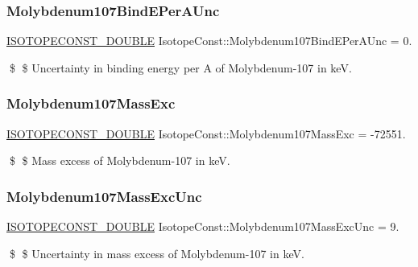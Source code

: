 \subsubsection{\texorpdfstring{Molybdenum107\+Bind\+E\+Per\+A\+Unc}{Molybdenum107BindEPerAUnc}}
{\footnotesize\ttfamily \mbox{\hyperlink{group___isotope_const-_macros_ga8f45a7272ce02c0b4c65c44636ed719a}{I\+S\+O\+T\+O\+P\+E\+C\+O\+N\+S\+T\+\_\+\+D\+O\+U\+B\+LE}} Isotope\+Const\+::\+Molybdenum107\+Bind\+E\+Per\+A\+Unc = 0.}

\$ \$ Uncertainty in binding energy per A of Molybdenum-\/107 in keV. \mbox{\label{group___isotope_const-_molybdenum-_mo107_ga0563f92515ff66e4d522d8627c73a3a8}} 
\subsubsection{\texorpdfstring{Molybdenum107\+Mass\+Exc}{Molybdenum107MassExc}}
{\footnotesize\ttfamily \mbox{\hyperlink{group___isotope_const-_macros_ga8f45a7272ce02c0b4c65c44636ed719a}{I\+S\+O\+T\+O\+P\+E\+C\+O\+N\+S\+T\+\_\+\+D\+O\+U\+B\+LE}} Isotope\+Const\+::\+Molybdenum107\+Mass\+Exc = -\/72551.}

\$ \$ Mass excess of Molybdenum-\/107 in keV. \mbox{\label{group___isotope_const-_molybdenum-_mo107_ga4f61c92e63e5756a5a1b2389e9ba7045}} 
\subsubsection{\texorpdfstring{Molybdenum107\+Mass\+Exc\+Unc}{Molybdenum107MassExcUnc}}
{\footnotesize\ttfamily \mbox{\hyperlink{group___isotope_const-_macros_ga8f45a7272ce02c0b4c65c44636ed719a}{I\+S\+O\+T\+O\+P\+E\+C\+O\+N\+S\+T\+\_\+\+D\+O\+U\+B\+LE}} Isotope\+Const\+::\+Molybdenum107\+Mass\+Exc\+Unc = 9.}

\$ \$ Uncertainty in mass excess of Molybdenum-\/107 in keV. \mbox{\label{group___isotope_const-_molybdenum-_mo107_gaa3414f67879a91f57370b0a7df076894}} 
